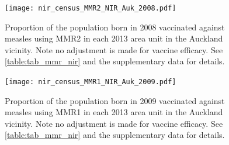 \documentclass{article}
\begin{document}
% 
\begin{figure}
\begin{center}
    \texttt{[image: nir\_census\_MMR2\_NIR\_Auk\_2008.pdf]}
 \end{center}
    \caption{Proportion of the population born in 2008 vaccinated against measles using MMR2 in each 2013 area unit in the Auckland vicinity. Note no adjustment is made for vaccine efficacy. See \autoref{table:tab_mmr_nir} and the supplementary data for details.}
\label{fig:fig22008_a}
\end{figure}
% 
% 
\begin{figure}
\begin{center}
    \texttt{[image: nir\_census\_MMR1\_NIR\_Auk\_2009.pdf]}
 \end{center}
    \caption{Proportion of the population born in 2009 vaccinated against measles using MMR1 in each 2013 area unit in the Auckland vicinity. Note no adjustment is made for vaccine efficacy. See \autoref{table:tab_mmr_nir} and the supplementary data for details.}
\label{fig:fig12009_a}
\end{figure}
\end{document}
